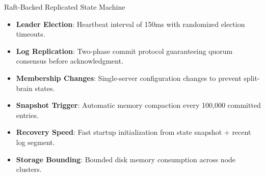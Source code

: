 \documentclass[
  style=simple,
  size=11pt,
  paper=screen,
  orient=landscape
]{powerdot}
\begin{document}
\begin{slide}{Raft-Backed Replicated State Machine}
\begin{minipage}{0.48\textwidth}
\begin{tcolorbox}[monobox,title=Consensus Mechanics]
\small
\begin{itemize}
  \item \textbf{Leader Election}: Heartbeat interval of 150ms with randomized election timeouts.
  \item \textbf{Log Replication}: Two-phase commit protocol guaranteeing quorum consensus before acknowledgment.
  \item \textbf{Membership Changes}: Single-server configuration changes to prevent split-brain states.
\end{itemize}
\end{tcolorbox}
\end{minipage}%
\hfill
\begin{minipage}{0.48\textwidth}
\begin{tcolorbox}[monobox,title=Log Compaction \& Snapshots]
\small
\begin{itemize}
  \item \textbf{Snapshot Trigger}: Automatic memory compaction every 100,000 committed entries.
  \item \textbf{Recovery Speed}: Fast startup initialization from state snapshot + recent log segment.
  \item \textbf{Storage Bounding}: Bounded disk memory consumption across node clusters.
\end{itemize}
\end{tcolorbox}
\end{minipage}
\end{slide}
\end{document}
